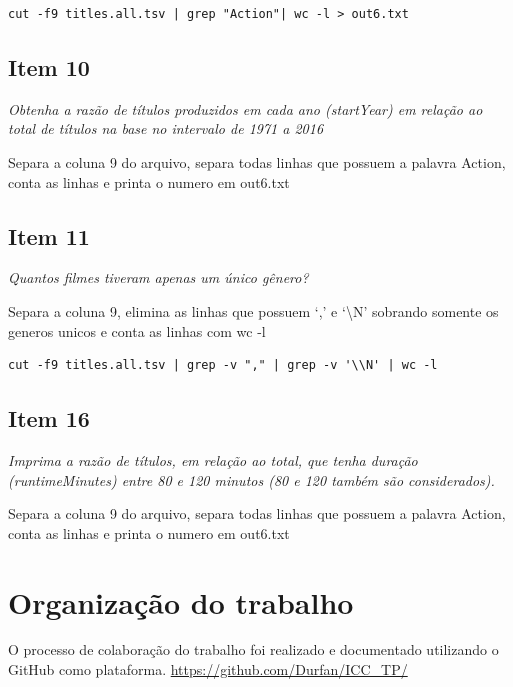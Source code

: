 \documentclass[12pt]{article}
\begin{document}
\begin{verbatim}
cut -f9 titles.all.tsv | grep "Action"| wc -l > out6.txt
\end{verbatim}

\subsection*{Item 10}

\noindent\emph{Obtenha a razão de títulos produzidos em cada ano (startYear) em relação ao total de títulos na base no intervalo de 1971 a 2016}
\vspace{1em}

Separa a coluna 9 do arquivo, separa todas linhas que possuem a palavra Action, conta as linhas e printa o numero em out6.txt

\subsection*{Item 11}

\noindent\emph{Quantos filmes tiveram apenas um único gênero?}
\vspace{1em}

Separa a coluna 9, elimina as linhas que possuem `,' e `\textbackslash N' sobrando somente os generos unicos e conta as linhas com wc -l

\begin{verbatim}
cut -f9 titles.all.tsv | grep -v "," | grep -v '\\N' | wc -l
\end{verbatim}

\subsection*{Item 16}

\noindent\emph{Imprima a razão de títulos, em relação ao total, que tenha duração (runtimeMinutes) entre 80 e 120 minutos (80 e 120 também são considerados).}
\vspace{1em}

Separa a coluna 9 do arquivo, separa todas linhas que possuem a palavra Action, conta as linhas e printa o numero em out6.txt

\section{Organização do trabalho}

O processo de colaboração do trabalho foi realizado e documentado utilizando o GitHub como plataforma. \url{https://github.com/Durfan/ICC_TP/}
\end{document}
